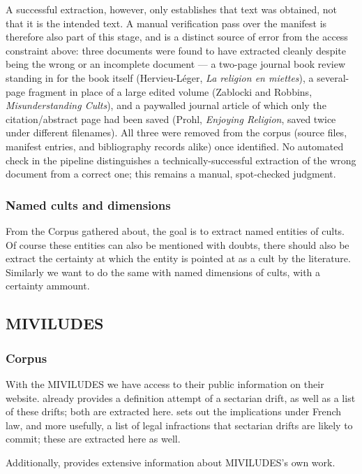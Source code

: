 A successful extraction, however, only establishes that text was obtained, not that it is the intended text. A manual verification pass over the manifest is therefore also part of this stage, and is a distinct source of error from the access constraint above: three documents were found to have extracted cleanly despite being the wrong or an incomplete document — a two-page journal book review standing in for the book itself (Hervieu-Léger, \textit{La religion en miettes}), a several-page fragment in place of a large edited volume (Zablocki and Robbins, \textit{Misunderstanding Cults}), and a paywalled journal article of which only the citation/abstract page had been saved (Prohl, \textit{Enjoying Religion}, saved twice under different filenames). All three were removed from the corpus (source files, manifest entries, and bibliography records alike) once identified. No automated check in the pipeline distinguishes a technically-successful extraction of the wrong document from a correct one; this remains a manual, spot-checked judgment.

\subsubsection{Named cults and dimensions}
From the Corpus gathered about, the goal is to extract named entities of cults. Of course these entities can also be mentioned with doubts, there should also be extract the certainty at which the entity is pointed at as a cult by the literature. 
Similarly we want to do the same with named dimensions of cults, with a certainty ammount. 

\subsection{MIVILUDES}

\subsubsection{Corpus}
With the MIVILUDES we have access to their public information on their website.
\Textcite{CommentIdentifierDerive} already provides a definition attempt of a sectarian drift, as well as a list of these drifts; both are extracted here.
\Textcite{QueDitLoi} sets out the implications under French law, and more usefully, a list of legal infractions that sectarian drifts are likely to commit; these are extracted here as well.

Additionally, \textcite{missioninterministerielledevigilanceetdeluttecontrelesderivessectairesmiviludesRapportDactiviteMiviludes2024} provides extensive information about MIVILUDES's own work.


